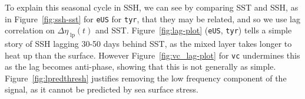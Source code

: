 







\label{sec:lag}



To explain this seasonal cycle in SSH, we can see by comparing SST and SSH, as in Figure~\ref{fig:ssh-sst}
for \texttt{eUS} for \texttt{tyr}, that they may be related,
and so we use lag correlation on $\Delta\eta_{\;\mathrm{lp}}(t)$ and SST.
Figure~\ref{fig:lag-plot} (\texttt{eUS}, \texttt{tyr}) tells a simple story of
SSH lagging 30-50 days behind SST, as the mixed layer takes longer
to heat up than the surface.
However Figure~\ref{fig:vc_lag-plot} for \texttt{vc} undermines this as the
lag becomes anti-phase, showing that this is not generally as simple.
Figure~\ref{fig:lpredthresh} justifies removing the low frequency
component of the signal, as it cannot be predicted by sea surface stress.

\FloatBarrier
